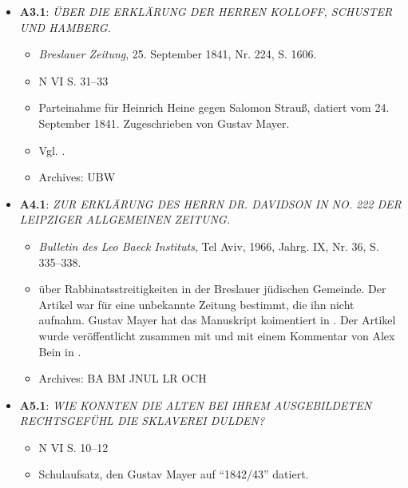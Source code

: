 \begin{itemize}
    
    		
    \item \textbf{A3.1}: \textit{ÜBER DIE ERKLÄRUNG DER HERREN KOLLOFF, SCHUSTER UND HAMBERG.}
    \begin{itemize}
        \item \textit{Breslauer Zeitung}, 25. September 1841, Nr. 224, S. 1606.
        \item N VI S. 31--33
        \item Parteinahme für Heinrich Heine gegen Salomon Strauß, datiert vom 24. September 1841. Zugeschrieben von Gustav Mayer.
        \item Vgl. .
        \item Archives: UBW
    \end{itemize}
    
    \item \textbf{A4.1}: \textit{ZUR ERKLÄRUNG DES HERRN DR. DAVIDSON IN NO. 222 DER LEIPZIGER ALLGEMEINEN ZEITUNG.}
    \begin{itemize}
        \item \textit{Bulletin des Leo Baeck Instituts}, Tel Aviv, 1966, Jahrg. IX, Nr. 36, S. 335--338.
        \item über Rabbinatsstreitigkeiten in der Breslauer jüdischen Gemeinde. Der Artikel war für eine unbekannte Zeitung bestimmt, die ihn nicht aufnahm. Gustav Mayer hat das Manuskript koimentiert in . Der Artikel wurde veröffentlicht zusammen mit  und mit einem Kommentar von Alex Bein in .
        \item Archives: BA BM JNUL LR OCH
    \end{itemize}
    
    \item \textbf{A5.1}: \textit{WIE KONNTEN DIE ALTEN BEI IHREM AUSGEBILDETEN RECHTSGEFÜHL DIE SKLAVEREI DULDEN?}
    \begin{itemize}
        \item N VI S. 10--12
        \item Schulaufsatz, den Gustav Mayer auf ``1842/43'' datiert.
    \end{itemize}
    

\end{itemize}
